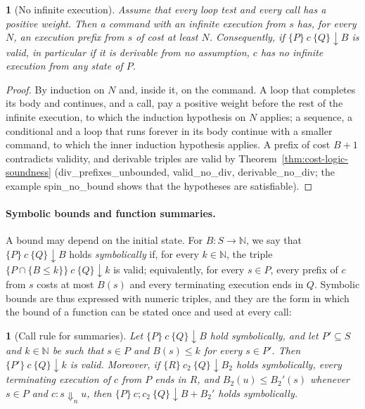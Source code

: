 \documentclass[oneside,english]{amsart}
\numberwithin{equation}{section}
\numberwithin{figure}{section}
\theoremstyle{plain}
\theoremstyle{definition}
\theoremstyle{plain}
\newtheorem{prop}[thm]{\protect\propositionname}
\theoremstyle{remark}
\theoremstyle{plain}
\theoremstyle{definition}
\theoremstyle{plain}
\theoremstyle{remark}
\newcommand{\lean}[1]{{\ttfamily\small #1}}
\providecommand{\propositionname}{Proposition}
\begin{document}
\begin{prop}[No infinite execution]
\label{prop:no-divergence}
Assume that every loop test and every call has a positive weight. Then a command with an infinite execution from $s$ has, for every $N$, an execution prefix from $s$ of cost at least $N$. Consequently, if $\{P\}\ c\ \{Q\}\!\downarrow\! B$ is valid, in particular if it is derivable from no assumption, $c$ has no infinite execution from any state of $P$.
\end{prop}
\begin{proof}
By induction on $N$ and, inside it, on the command. A loop that completes its body and continues, and a call, pay a positive weight before the rest of the infinite execution, to which the induction hypothesis on $N$ applies; a sequence, a conditional and a loop that runs forever in its body continue with a smaller command, to which the inner induction hypothesis applies. A prefix of cost $B + 1$ contradicts validity, and derivable triples are valid by Theorem~\ref{thm:cost-logic-soundness} (\lean{div\_\allowbreak prefixes\_\allowbreak unbounded}, \lean{valid\_\allowbreak no\_\allowbreak div}, \lean{derivable\_\allowbreak no\_\allowbreak div}; the example \lean{spin\_\allowbreak no\_\allowbreak bound} shows that the hypotheses are satisfiable).
\end{proof}

\paragraph{Symbolic bounds and function summaries.}
A bound may depend on the initial state. For $B : S \to \mathbb{N}$, we say that $\{P\}\ c\ \{Q\}\!\downarrow\! B$ holds \emph{symbolically} if, for every $k \in \mathbb{N}$, the triple $\{P \cap \{B \le k\}\}\ c\ \{Q\}\!\downarrow\! k$ is valid; equivalently, for every $s \in P$, every prefix of $c$ from $s$ costs at most $B(s)$ and every terminating execution ends in $Q$. Symbolic bounds are thus expressed with numeric triples, and they are the form in which the bound of a function can be stated once and used at every call:

\begin{prop}[Call rule for summaries]
\label{prop:summary-call}
Let $\{P\}\ c\ \{Q\}\!\downarrow\! B$ hold symbolically, and let $P' \subseteq S$ and $k \in \mathbb{N}$ be such that $s \in P$ and $B(s) \le k$ for every $s \in P'$. Then $\{P'\}\ c\ \{Q\}\!\downarrow\! k$ is valid. Moreover, if $\{R\}\ c_2\ \{Q\}\!\downarrow\! B_2$ holds symbolically, every terminating execution of $c$ from $P$ ends in $R$, and $B_2(u) \le B_2'(s)$ whenever $s \in P$ and $c : s \Downarrow_n u$, then $\{P\}\ c ; c_2\ \{Q\}\!\downarrow\! B + B_2'$ holds symbolically.
\end{prop}
\end{document}
